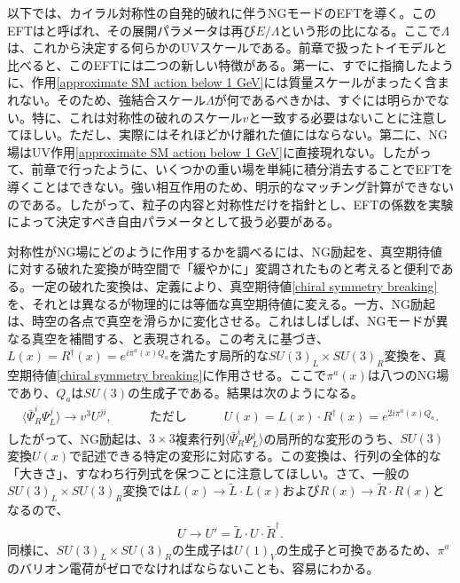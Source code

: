 以下では、カイラル対称性の自発的破れに伴うNGモードのEFTを導く。このEFTはと呼ばれ、その展開パラメータは再び$E /\Lambda$という形の比になる。ここで$\Lambda$は、これから決定する何らかのUVスケールである。前章で扱ったトイモデルと比べると、このEFTには二つの新しい特徴がある。第一に、すでに指摘したように、作用\eqref{approximate SM action below 1 GeV}には質量スケールがまったく含まれない。そのため、強結合スケール$\Lambda$が何であるべきかは、すぐには明らかでない。特に、これは対称性の破れのスケール$v$と一致する必要はないことに注意してほしい。ただし、実際にはそれほどかけ離れた値にはならない。第二に、NG場はUV作用\eqref{approximate SM action below 1 GeV}に直接現れない。したがって、前章で行ったように、いくつかの重い場を単純に積分消去することでEFTを導くことはできない。強い相互作用のため、明示的なマッチング計算ができないのである。したがって、粒子の内容と対称性だけを指針とし、EFTの係数を実験によって決定すべき自由パラメータとして扱う必要がある。

対称性がNG場にどのように作用するかを調べるには、NG励起を、真空期待値に対する破れた変換が時空間で「緩やかに」変調されたものと考えると便利である。一定の破れた変換は、定義により、真空期待値\eqref{chiral symmetry breaking}を、それとは異なるが物理的には等価な真空期待値に変える。一方、NG励起は、時空の各点で真空を滑らかに変化させる。これはしばしば、NGモードが異なる真空を補間する、と表現される。この考えに基づき、$L(x) = R^\dag (x) = e^{i \pi^a(x) Q_a}$を満たす局所的な$SU(3)_L \times SU(3)_R$変換を、真空期待値\eqref{chiral symmetry breaking}に作用させる。ここで$\pi^a(x)$は八つのNG場であり、$Q_a$は$SU(3)$の生成子である。結果は次のようになる。
%
\begin{align}
	\langle \bar \Psi^i_R \Psi_L^j \rangle \to v^3 U^{ji} , \qquad \quad \text{ただし} \qquad \quad U (x) = L(x) \cdot R^\dag (x) = e^{2 i \pi^a(x) Q_a} .
\end{align}
%
したがって、NG励起は、$3 \times 3$複素行列$\langle \bar \Psi^i_R \Psi_L^j \rangle$の局所的な変形のうち、$SU(3)$変換$U(x)$で記述できる特定の変形に対応する。この変換は、行列の全体的な「大きさ」、すなわち行列式を保つことに注意してほしい。さて、一般の$SU(3)_L \times SU(3)_R$変換では$L(x) \to \tilde L \cdot L(x)$および$R(x) \to \tilde R \cdot R(x)$となるので、
%
\begin{align} \label{chiral transformations U}
	U \to U' = \tilde L \cdot  U \cdot \tilde R^\dag .
\end{align}
%
同様に、$SU(3)_L \times SU(3)_R$の生成子は$U(1)_V$の生成子と可換であるため、$\pi^a$のバリオン電荷がゼロでなければならないことも、容易にわかる。


